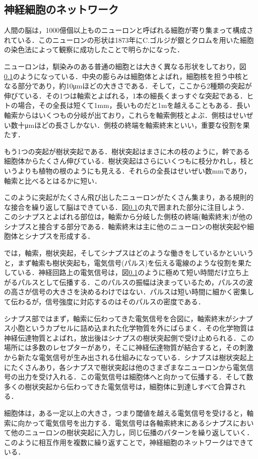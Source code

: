 \documentclass[a4paper,11pt]{jsreport}
\begin{document}
\subsection{神経細胞のネットワーク}
人間の脳は，1000億個以上ものニューロンと呼ばれる細胞が寄り集まって構成されている．このニューロンの形状は1873年にC.ゴルジが銀とクロムを用いた細胞の染色法によって観察に成功したことで明らかになった．\par
ニューロンは，馴染みのある普通の細胞とは大きく異なる形状をしており，図\ref{}のようになっている．中央の膨らみは細胞体とよばれ，細胞核を担う中核となる部分であり，約10μmほどの大きさである．そして，ここから2種類の突起が伸びている．その1つは軸索とよばれる，1本の細長くまっすぐな突起である．ヒトの場合，その全長は短くて1mm，長いものだと1mを越えることもある．長い軸索からはいくつもの分岐が出ており，これらを軸索側枝とよぶ．側枝はせいぜい数十μmほどの長さしかない．側枝の終端を軸索終末といい，重要な役割を果たす．\par
もう1つの突起が樹状突起である．樹状突起はまさに木の枝のように，幹である細胞体からたくさん伸びている．樹状突起はさらにいくつもに枝分かれし，枝というよりも植物の根のようにも見える．それらの全長はせいぜい数mmであり，軸索と比べるとはるかに短い．\par
このように突起がたくさん飛び出したニューロンがたくさん集まり，ある規則的な接合を繰り返して脳はできている．図\ref{}の丸で囲まれた部分に注目しよう．このシナプスとよばれる部位は，軸索から分岐した側枝の終端(軸索終末)が他のシナプスと接合する部分である．軸索終末は主に他のニューロンの樹状突起や細胞体とシナプスを形成する．\par
では，軸索，樹状突起，そしてシナプスはどのような働きをしているかといいうと，まず軸索も樹状突起も，電気信号(パルス)を伝える電線のような役割を果たしている．神経回路上の電気信号は，図\ref{}のように極めて短い時間だけ立ち上がるパルスとして伝播する．このパルスの振幅は決まっているため，パルスの波の高さが信号の大きさを決めるわけではない．パルスは短い時間に細かく密集して伝わるが，信号強度に対応するのはそのパルスの密度である．\par
シナプス部ではまず，軸索に伝わってきた電気信号を合図に，軸索終末がシナプス小胞というカプセルに詰め込まれた化学物質を外にばらまく．その化学物質は神経伝達物質とよばれ，放出後はシナプスの樹状突起側で受け止められる．この場所には多数のレセプターがあり，そこに神経伝達物質が結合すると，その刺激から新たな電気信号が生み出される仕組みになっている．シナプスは樹状突起上にたくさんあり，各シナプスで樹状突起は他のさまざまなニューロンから電気信号の出力を受け入れる．この電気信号は細胞体へと向かって伝播する．そして数多くの樹状突起から伝わってきた電気信号は，細胞体に到達しすべて合算される．\par
細胞体は，ある一定以上の大きさ，つまり閾値を越える電気信号を受けると，軸索に向かって電気信号を出力する．電気信号は各軸索終末にあるシナプスにおいて他のニューロンの樹状突起に入力し，同じ伝播のパターンを繰り返していく．このように相互作用を複数に繰り返すことで，神経細胞のネットワークはできている．
\end{document}
